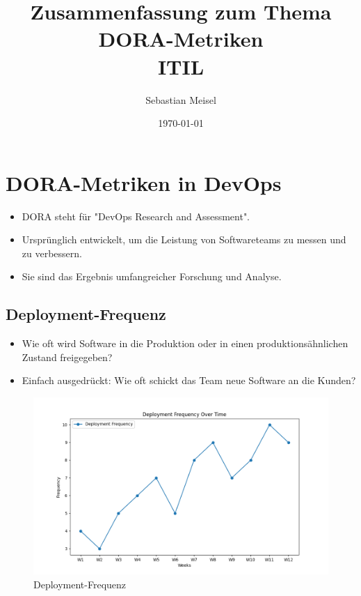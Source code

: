 \documentclass{orgstandard}
\author{Sebastian Meisel}
\date{\today}
\title{Zusammenfassung zum Thema DORA-Metriken\\\medskip
\large ITIL}
\begin{document}
\maketitle


\section{DORA-Metriken in DevOps}
\label{sec:org8364cba}
\begin{itemize}
\item DORA steht für "DevOps Research and Assessment".
\item Ursprünglich entwickelt, um die Leistung von Softwareteams zu messen und zu verbessern.
\item Sie sind das Ergebnis umfangreicher Forschung und Analyse.
\end{itemize}

\subsection{Deployment-Frequenz}
\label{sec:org26a6802}
\begin{itemize}
\item Wie oft wird Software in die Produktion oder in einen produktionsähnlichen Zustand freigegeben?
\item Einfach ausgedrückt: Wie oft schickt das Team neue Software an die Kunden?
\end{itemize}
\begin{figure}[htbp]
\centering
\includegraphics[width=.65\linewidth]{img/DeploymentFrequency.png}
\caption{\label{fig:orge492662}Deployment-Frequenz}
\end{figure}
\end{document}
